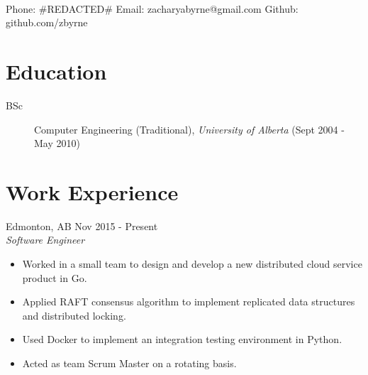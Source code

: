 \documentclass[10pt]{article}
\begin{document}
\newenvironment{mitemize}{
\begin{itemize}
  \setlength{\topsep}{0pt}
  \setlength{\itemsep}{1pt}
  \setlength{\parskip}{0pt}
  \setlength{\parsep}{0pt}}{\end{itemize}
}
\setlength{\parskip}{0pt}
\setlength{\topskip}{0pt}
\pagestyle{empty}

 \vspace{0.2cm}\\
Phone: \#REDACTED\# \hspace{1.5cm} Email: zacharyabyrne@gmail.com
\hspace{1.5cm} Github: github.com/zbyrne

\section*{Education}
\begin{description}
  \item [BSc] Computer Engineering (Traditional), \emph{University of Alberta} (Sept 2004 - May 2010)\\
\end{description}

\section*{Work Experience}
 \hspace{0.5in} Edmonton, AB \hspace{0.5in} Nov 2015 - Present\\
\emph{Software Engineer}
\begin{mitemize}
  \item Worked in a small team to design and develop a new distributed
    cloud service product in Go.
  \item Applied RAFT consensus algorithm to implement replicated data
    structures and distributed locking.
  \item Used Docker to implement an integration testing environment in Python.
  \item Acted as team Scrum Master on a rotating basis.
\end{mitemize}
\end{document}
